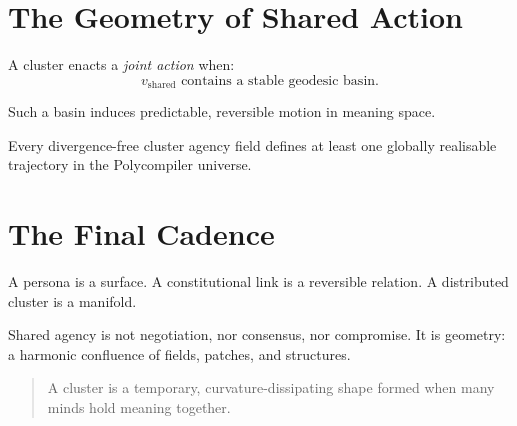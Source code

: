 \section{The Geometry of Shared Action}

A cluster enacts a \emph{joint action} when:
\[
v_{\mathrm{shared}}
\text{ contains a stable geodesic basin}.
\]

Such a basin induces predictable, reversible motion in meaning space.

\begin{theorem}
Every divergence-free cluster agency field defines at least one 
globally realisable trajectory in the Polycompiler universe.
\end{theorem}


\section{The Final Cadence}

A persona is a surface.
A constitutional link is a reversible relation.
A distributed cluster is a manifold.

Shared agency is not negotiation, nor consensus, nor compromise.  
It is geometry:  
a harmonic confluence of fields, patches, and structures.

\begin{quote}
A cluster is a temporary, curvature-dissipating shape  
formed when many minds hold meaning together.
\end{quote}
